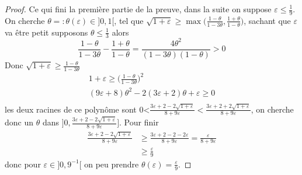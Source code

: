\documentclass[12pt]{article}
\theoremstyle{definition}
\begin{document}
\begin{proof}
	Ce qui fini la première partie de la preuve, dans la suite on suppose $\varepsilon\leq \frac{1}{9}$. On cherche $\theta=:\theta(\varepsilon)\in]0,1[$, tel que $\sqrt{1+\varepsilon}\geq \max\big(\frac{1-\theta}{1-3\theta},\frac{1+\theta}{1-\theta}\big)$, sachant que $\varepsilon$ va être petit supposons $\theta\leq \frac{1}{3}$ alors
	\begin{equation*}
	\frac{1-\theta}{1-3\theta}-\frac{1+\theta}{1-\theta} = \frac{4\theta^2}{(1-3\theta) (1-\theta)}>0
	\end{equation*}
	Donc $\sqrt{1+\varepsilon}\geq \frac{1-\theta}{1-3\theta}$
	\begin{equation*}
	\begin{array}{ccc}
	1+\varepsilon \geq  \big(\frac{1-\theta}{1-3\theta}\big)^2\\
	(9\varepsilon+8)\theta^2 - 2(3\varepsilon+2)\theta +\varepsilon \geq 0\\
	\end{array}
	\end{equation*}
	les deux racines de ce polynôme sont 0<$\frac{3\varepsilon+2-2\sqrt{1+\varepsilon}}{8+9\varepsilon}<\frac{3\varepsilon+2+2\sqrt{1+\varepsilon}}{8+9\varepsilon}$, on cherche donc un $\theta$ dans $]0,\frac{3\varepsilon+2-2\sqrt{1+\varepsilon}}{8+9\varepsilon}]$. Pour finir 
	\begin{align*}
	\frac{3\varepsilon+2-2\sqrt{1+\varepsilon}}{8+9\varepsilon}&\geq \frac{3\varepsilon+2-2-2\varepsilon}{8+9\varepsilon}=\frac{\varepsilon}{8+9\varepsilon}\\
	&\geq \frac{\varepsilon}{9}
	\end{align*}
	donc pour $\varepsilon\in]0,9^{-1}[$ on peu prendre $\theta(\varepsilon)=\frac{\varepsilon}{9}$.
\end{proof}
\end{document}
